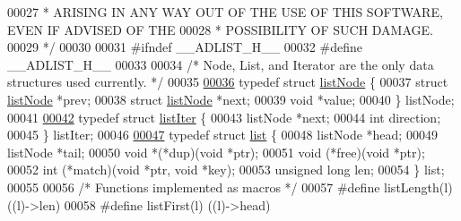 \begin{DoxyCode}
00027 \textcolor{comment}{ * ARISING IN ANY WAY OUT OF THE USE OF THIS SOFTWARE, EVEN IF ADVISED OF THE}
00028 \textcolor{comment}{ * POSSIBILITY OF SUCH DAMAGE.}
00029 \textcolor{comment}{ */}
00030 
00031 \textcolor{preprocessor}{#}\textcolor{preprocessor}{ifndef} \textcolor{preprocessor}{\_\_ADLIST\_H\_\_}
00032 \textcolor{preprocessor}{#}\textcolor{preprocessor}{define} \textcolor{preprocessor}{\_\_ADLIST\_H\_\_}
00033 
00034 \textcolor{comment}{/* Node, List, and Iterator are the only data structures used currently. */}
00035 
\hyperlink{structlistNode}{00036} \textcolor{keyword}{typedef} \textcolor{keyword}{struct} \hyperlink{structlistNode}{listNode} \{
00037     \textcolor{keyword}{struct} \hyperlink{structlistNode}{listNode} *prev;
00038     \textcolor{keyword}{struct} \hyperlink{structlistNode}{listNode} *next;
00039     \textcolor{keywordtype}{void} *value;
00040 \} listNode;
00041 
\hyperlink{structlistIter}{00042} \textcolor{keyword}{typedef} \textcolor{keyword}{struct} \hyperlink{structlistIter}{listIter} \{
00043     listNode *next;
00044     \textcolor{keywordtype}{int} direction;
00045 \} listIter;
00046 
\hyperlink{structlist}{00047} \textcolor{keyword}{typedef} \textcolor{keyword}{struct} \hyperlink{structlist}{list} \{
00048     listNode *head;
00049     listNode *tail;
00050     \textcolor{keywordtype}{void} *(*dup)(\textcolor{keywordtype}{void} *ptr);
00051     \textcolor{keywordtype}{void} (*free)(\textcolor{keywordtype}{void} *ptr);
00052     \textcolor{keywordtype}{int} (*match)(\textcolor{keywordtype}{void} *ptr, \textcolor{keywordtype}{void} *key);
00053     \textcolor{keywordtype}{unsigned} \textcolor{keywordtype}{long} len;
00054 \} list;
00055 
00056 \textcolor{comment}{/* Functions implemented as macros */}
00057 \textcolor{preprocessor}{#}\textcolor{preprocessor}{define} \textcolor{preprocessor}{listLength}\textcolor{preprocessor}{(}\textcolor{preprocessor}{l}\textcolor{preprocessor}{)} \textcolor{preprocessor}{(}\textcolor{preprocessor}{(}\textcolor{preprocessor}{l}\textcolor{preprocessor}{)}\textcolor{preprocessor}{->}\textcolor{preprocessor}{len}\textcolor{preprocessor}{)}
00058 \textcolor{preprocessor}{#}\textcolor{preprocessor}{define} \textcolor{preprocessor}{listFirst}\textcolor{preprocessor}{(}\textcolor{preprocessor}{l}\textcolor{preprocessor}{)} \textcolor{preprocessor}{(}\textcolor{preprocessor}{(}\textcolor{preprocessor}{l}\textcolor{preprocessor}{)}\textcolor{preprocessor}{->}\textcolor{preprocessor}{head}\textcolor{preprocessor}{)}

\end{DoxyCode}
